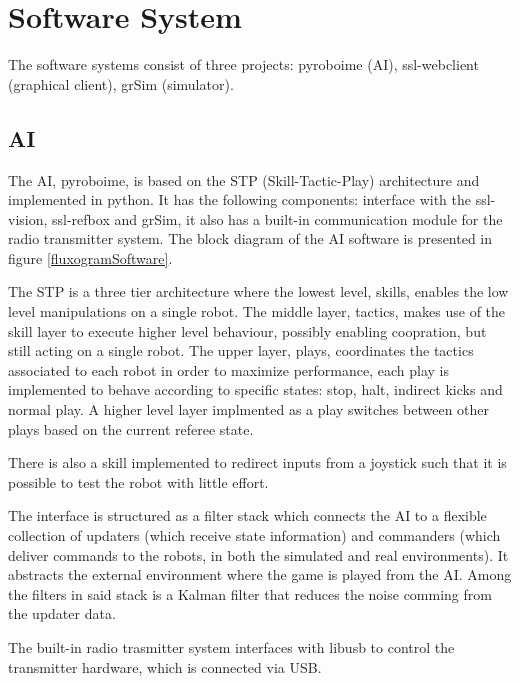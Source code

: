 \section{Software System}\label{soft_sys_sec}

The software systems consist of three projects: pyroboime (AI), ssl-webclient (graphical client), grSim (simulator).

\subsection{AI}

The AI, pyroboime, is based on the STP (Skill-Tactic-Play) architecture and implemented in python.
It has the following components: interface with the ssl-vision, ssl-refbox and grSim, it also has a built-in communication module for the radio transmitter system.
The block diagram of the AI software is presented in figure \ref{fluxogramSoftware}.

The STP is a three tier architecture where the lowest level, skills, enables the low level manipulations on a single robot.
The middle layer, tactics, makes use of the skill layer to execute higher level behaviour, possibly enabling coopration, but still acting on a single robot.
The upper layer, plays, coordinates the tactics associated to each robot in order to maximize performance, each play is implemented to behave according to specific states: stop, halt, indirect kicks and normal play.
A higher level layer implmented as a play switches between other plays based on the current referee state.

There is also a skill implemented to redirect inputs from a joystick such that it is possible to test the robot with little effort.

The interface is structured as a filter stack which connects the AI to a flexible collection of updaters (which receive state information) and commanders (which deliver commands to the robots, in both the simulated and real environments).
It abstracts the external environment where the game is played from the AI.
Among the filters in said stack is a Kalman filter that reduces the noise comming from the updater data.

The built-in radio trasmitter system interfaces with libusb to control the transmitter hardware, which is connected via USB.

